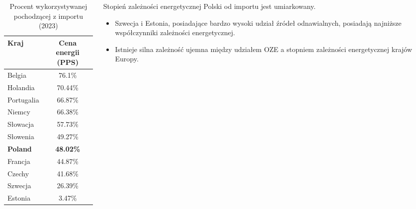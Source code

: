 \begin{columns}[T]
    \begin{column}{0.6\textwidth}
        \begin{table}[h]
            \footnotesize
            \begin{tabular}{lc}
                \toprule
                \textbf{Kraj} & \textbf{Cena energii (PPS)} \\
                \midrule
                Belgia & 76.1\% \\
                Holandia & 70.44\% \\
                Portugalia & 66.87\% \\
                Niemcy & 66.38\% \\
                Słowacja & 57.73\% \\
                Słowenia & 49.27\% \\
                \textcolor{renewable}{\textbf{Poland}} & \textcolor{renewable}{\textbf{48.02\%}} \\
                Francja & 44.87\% \\
                Czechy & 41.68\% \\
                \rowcolor{green!10}
                Szwecja & 26.39\% \\
                \rowcolor{green!10}
                Estonia & 3.47\% \\
                \bottomrule
            \end{tabular}
                    \vspace{-0.1em}
            \caption{Procent wykorzystywanej pochodzącej z importu (2023)}
        \end{table}
    \end{column}

    \begin{column}{0.5\textwidth}
        \vspace{-2.2em}
        \begin{tcolorbox}[colback=blue!10,colframe=blue!50!black,title=Wniosek kluczowy]
            Stopień zależności energetycznej Polski od importu jest umiarkowany.
        \end{tcolorbox}
        \vspace{-0em}
        \begin{itemize}
            \item \small Szwecja i Estonia, posiadające bardzo wysoki udział źródeł odnawialnych, posiadają najniższe współczynniki zależności energetycznej.
            \item \small Istnieje silna zależność ujemna między udziałem OZE a stopniem zależności energetycznej krajów Europy.
        \end{itemize}
    \end{column}
\end{columns}

